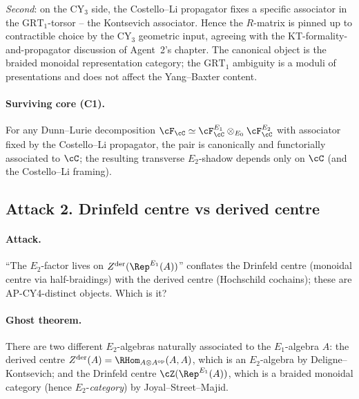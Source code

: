 \emph{Second}: on the CY$_3$ side, the Costello--Li propagator
\cite[\S 6]{CostelloLi2016} fixes a specific associator in the
$\mathrm{GRT}_1$-torsor -- the Kontsevich associator.  Hence the
$R$-matrix is pinned up to contractible choice by the CY$_3$ geometric
input, agreeing with the KT-formality-and-propagator discussion of
Agent~2's chapter.  The canonical object is the braided monoidal
representation category; the $\mathrm{GRT}_1$ ambiguity is a moduli
of presentations and does not affect the Yang--Baxter content.

\paragraph{Surviving core (C1).}  For any Dunn--Lurie decomposition
$\cF_\cC \simeq \cF^{E_1}_\cC \otimes_{E_0} \cF^{E_2}_\cC$ with
associator fixed by the Costello--Li propagator, the pair is
canonically and functorially associated to $\cC$; the resulting
transverse $E_2$-shadow depends only on $\cC$ (and the Costello--Li
framing).


\subsection*{Attack 2.  Drinfeld centre vs derived centre}

\paragraph{Attack.}  ``The $E_2$-factor lives on $Z^{\mathrm{der}}
(\Rep^{E_1}(A))$'' conflates the Drinfeld centre (monoidal centre via
half-braidings) with the derived centre (Hochschild cochains); these
are AP-CY4-distinct objects.  Which is it?

\paragraph{Ghost theorem.}  There are two different $E_2$-algebras
naturally associated to the $E_1$-algebra $A$: the derived centre
$Z^{\mathrm{der}}(A) = \RHom_{A \otimes A^{\mathrm{op}}}(A, A)$, which
is an $E_2$-algebra by Deligne--Kontsevich; and the Drinfeld centre
$\cZ(\Rep^{E_1}(A))$, which is a braided monoidal category (hence
$E_2$-\emph{category}) by Joyal--Street--Majid.


